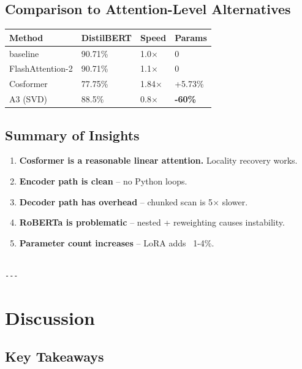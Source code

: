 \subsection{Comparison to Attention-Level Alternatives}

\begin{table}[H]
\centering
\small
\begin{tabular}{llll}
\toprule
\textbf{Method} & \textbf{DistilBERT} & \textbf{Speed} & \textbf{Params} \\
\midrule
baseline & 90.71\% & 1.0$\times$ & 0 \\
FlashAttention-2 & 90.71\% & 1.1$\times$ & 0 \\
Cosformer & 77.75\% & 1.84$\times$ & +5.73\% \\
A3 (SVD) & 88.5\% & 0.8$\times$ & \textbf{-60\%} \\
\bottomrule
\end{tabular}
\end{table}

\subsection{Summary of Insights}

\begin{enumerate}
\item \textbf{Cosformer is a reasonable linear attention.} Locality recovery works.
\item \textbf{Encoder path is clean} -- no Python loops.
\item \textbf{Decoder path has overhead} -- chunked scan is 5$\times$ slower.
\item \textbf{RoBERTa is problematic} -- nested + reweighting causes instability.
\item \textbf{Parameter count increases} -- LoRA adds ~1-4\%.
\end{enumerate}
\begin{lstlisting}

---
\end{lstlisting}


\section{Discussion}

\subsection{Key Takeaways}

